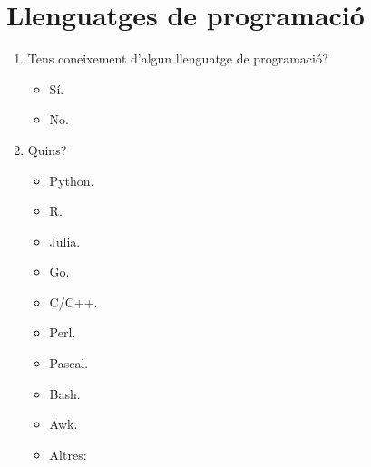 \documentclass[a4paper,12pt]{article}
\newcounter{preg}[section]
\begin{document}
\section{Llenguatges de programació}
\begin{enumerate}
\item {} Tens coneixement d'algun llenguatge de programació?
   \begin{itemize}
   \item Sí.
   \item No.
   \end{itemize}

\item Quins?
   \begin{itemize}
   \item Python.
   \item R.
   \item Julia.
   \item Go.
   \item C/C++.
   \item Perl.
   \item Pascal.
   \item Bash.
   \item Awk.
   \item Altres:
   \end{itemize}
\end{enumerate}
\end{document}
